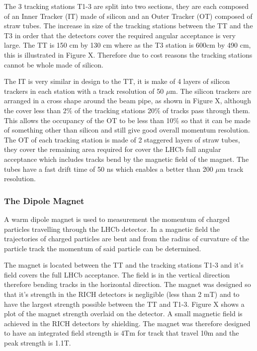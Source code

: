 The 3 tracking stations T1-3 are split into two sections, they are each composed of an Inner Tracker (IT) made of silicon and an Outer Tracker (OT) composed of straw tubes. 
The increase in size of the tracking stations between the TT and the T3 in order that the detectors cover the required angular acceptance is very large.  The TT is 150 cm by 130 cm where as the T3 station is 600cm by 490 cm, this is illustrated in Figure X. Therefore due to cost reasons the tracking stations cannot be whole made of silicon. 

The IT is very similar in design to the TT, it is make of 4 layers of silicon trackers in each station with a track resolution of 50 $\mu$m.
The silicon trackers are arranged in a cross shape around the beam pipe, as shown in Figure X, although the cover less than 2$\%$ of the tracking stations 20$\%$ of tracks pass through them. This allows the occupancy of the OT to be less than 10$\%$ so that it can be made of something other than silicon and still give good overall momentum resolution. The OT of each tracking station is made of 2 staggered layers of straw tubes, they cover the remaining area required for cover the LHCb full angular acceptance which includes tracks bend by the magnetic field of the magnet. The tubes have a fast drift time of 50 ns which enables a better than 200 $\mu$m track resolution. 


\subsubsection{The Dipole Magnet}
A warm dipole magnet is used to measurement the momentum of charged particles travelling through the LHCb detector. In a magnetic field the trajectories of charged particles are bent and from the radius of curvature of the particle track the momentum of said particle can be determined.

The magnet is located between the TT and the tracking stations T1-3 and it’s field covers the full LHCb acceptance. The field is in the vertical direction therefore bending tracks in the horizontal direction. The magnet was designed so that it’s strength in the RICH detectors is negligible (less than 2 mT) and to have the largest strength possible between the TT and T1-3. Figure X shows a plot of the magnet strength overlaid on the detector. A small magnetic field is achieved in the RICH detectors by shielding. The magnet was therefore designed to have an integrated field strength is 4Tm for track that travel 10m and the peak strength is 1.1T. %

